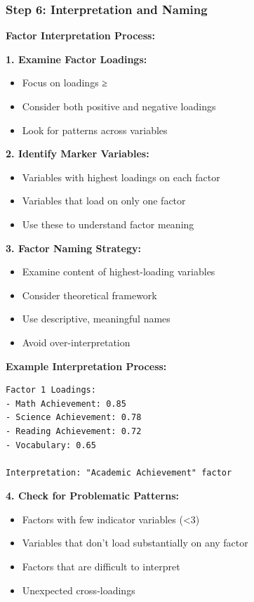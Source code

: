 \documentclass[
]{article}
\begin{document}
\subsubsection{Step 6: Interpretation and Naming}

\textbf{Factor Interpretation Process:}

\textbf{1. Examine Factor Loadings:}

\begin{itemize}
\item
  Focus on loadings ≥ \textbar{}
\item
  Consider both positive and negative loadings
\item
  Look for patterns across variables
\end{itemize}

\textbf{2. Identify Marker Variables:}

\begin{itemize}
\item
  Variables with highest loadings on each factor
\item
  Variables that load on only one factor
\item
  Use these to understand factor meaning
\end{itemize}

\textbf{3. Factor Naming Strategy:}

\begin{itemize}
\item
  Examine content of highest-loading variables
\item
  Consider theoretical framework
\item
  Use descriptive, meaningful names
\item
  Avoid over-interpretation
\end{itemize}

\textbf{Example Interpretation Process:}

\begin{verbatim}
Factor 1 Loadings:
- Math Achievement: 0.85
- Science Achievement: 0.78
- Reading Achievement: 0.72
- Vocabulary: 0.65

Interpretation: "Academic Achievement" factor
\end{verbatim}

\textbf{4. Check for Problematic Patterns:}

\begin{itemize}
\item
  Factors with few indicator variables (\textless3)
\item
  Variables that don't load substantially on any factor
\item
  Factors that are difficult to interpret
\item
  Unexpected cross-loadings
\end{itemize}
\end{document}
